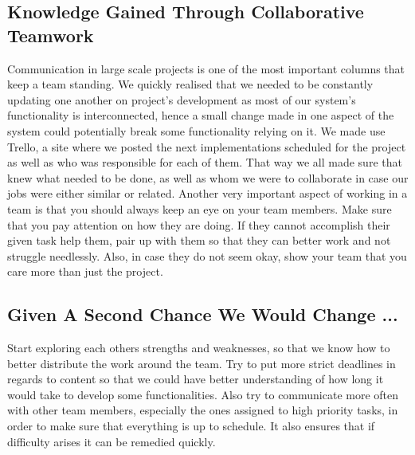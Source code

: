 \documentclass[11pt,a4paper]{article}
\begin{document}
        \subsection{Knowledge Gained Through Collaborative Teamwork}
        Communication in large scale projects is one of the most important columns that keep a team standing. We quickly realised that we needed to be constantly updating one another on project's development as most of our system's functionality is interconnected, hence a small change made in one aspect of the system could potentially break some functionality relying on it.
        We made use Trello, a site where we posted the next implementations scheduled for the project as well as who was responsible for each of them. That way we all made sure that knew what needed to be done, as well as whom we were to collaborate in case our jobs were either similar or related.
        Another very important aspect of working in a team is that you should always keep an eye on your team members. Make sure that you pay attention on how they are doing. If they cannot accomplish their given task help them, pair up with them so that they can better work and not struggle needlessly. Also, in case they do not seem okay, show your team that you care more than just the project.
         

        \subsection{Given A Second Chance We Would Change ...}
        Start exploring each others strengths and weaknesses, so that we know how to better distribute the work around the team. Try to put more strict deadlines in regards to content so that we could have better understanding of how long it would take to develop some functionalities. 
        Also try to communicate more often with other team members, especially the ones assigned to high priority tasks, in order to make sure that everything is up to schedule. It also ensures that if difficulty arises it can be remedied quickly.
\end{document}
